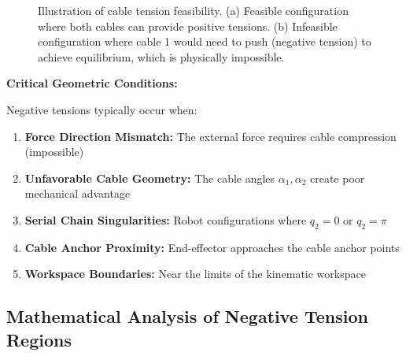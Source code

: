 \begin{figure}[htbp]
\caption{Illustration of cable tension feasibility. (a) Feasible configuration where both cables can provide positive tensions. (b) Infeasible configuration where cable 1 would need to push (negative tension) to achieve equilibrium, which is physically impossible.}
\label{fig:negative_tension_cases}
\end{figure}

\textbf{Critical Geometric Conditions:}

Negative tensions typically occur when:
\begin{enumerate}
    \item \textbf{Force Direction Mismatch:} The external force requires cable compression (impossible)
    \item \textbf{Unfavorable Cable Geometry:} The cable angles $\alpha_1, \alpha_2$ create poor mechanical advantage
    \item \textbf{Serial Chain Singularities:} Robot configurations where $q_2 = 0$ or $q_2 = \pi$
    \item \textbf{Cable Anchor Proximity:} End-effector approaches the cable anchor points
    \item \textbf{Workspace Boundaries:} Near the limits of the kinematic workspace
\end{enumerate}

\subsection{Mathematical Analysis of Negative Tension Regions}

